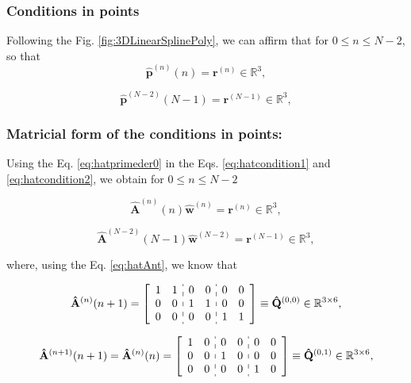 \subsubsection{Conditions in points}

Following the Fig. \ref{fig:3DLinearSplinePoly}, 
we can affirm that for $0 \leq n\leq N-2$,
so that
\begin{equation}\label{eq:hatcondition1}
\mathbf{\hat{p}}^{(n)}(n)=\mathbf{r}^{(n)}
\in \mathbb{R}^{3},
\end{equation}

\begin{equation}\label{eq:hatcondition2}
\mathbf{\hat{p}}^{(N-2)}(N-1)=\mathbf{r}^{(N-1)}
\in \mathbb{R}^{3},
\end{equation}

\subsubsection{Matricial form of the conditions in points:}

Using 
the Eq. \ref{eq:hatprimeder0} in 
the Eqs. \ref{eq:hatcondition1} and \ref{eq:hatcondition2},
we obtain for $0 \leq n\leq N-2$

\begin{equation}\label{eq:hatpointcond1}
\mathbf{\hat{A}}^{(n)}(n) \mathbf{\hat{w}}^{(n)}=\mathbf{r}^{(n)}
\in \mathbb{R}^{3},
\end{equation}

\begin{equation}\label{eq:hatpointcond2}
\mathbf{\hat{A}}^{(N-2)}(N-1) \mathbf{\hat{w}}^{(N-2)}=\mathbf{r}^{(N-1)}
\in \mathbb{R}^{3},
\end{equation}


where, using the Eq. \ref{eq:hatAnt}, we know that

\begin{equation}\label{eq:hatQ00}
\mathbf{\hat{A}}^{(n)}(n+1)=
\left[
\begin{array}{cc:cc:cc}
1 & 1 & 0 & 0 & 0 & 0 \\
0 & 0 & 1 & 1 & 0 & 0 \\
0 & 0 & 0 & 0 & 1 & 1 
\end{array}
\right]
\equiv \mathbf{\hat{Q}}^{(0,0)}\in \mathbb{R}^{3\times 6},
\end{equation}

\begin{equation}\label{eq:hatQ01}
\mathbf{\hat{A}}^{(n+1)}(n+1)
=
\mathbf{\hat{A}}^{(n)}(n)
=
\left[
\begin{array}{cc:cc:cc}
1 & 0 & 0 & 0 & 0 & 0 \\
0 & 0 & 1 & 0 & 0 & 0 \\
0 & 0 & 0 & 0 & 1 & 0 
\end{array}
\right]
\equiv \mathbf{\hat{Q}}^{(0,1)}\in \mathbb{R}^{3\times 6},
\end{equation}

